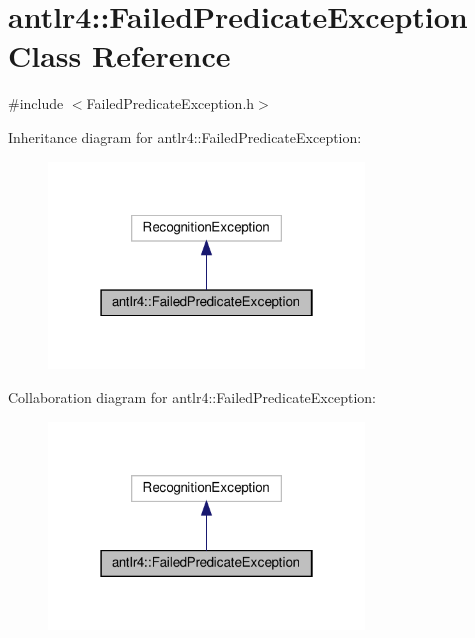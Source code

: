 \hypertarget{classantlr4_1_1FailedPredicateException}{}\section{antlr4\+:\+:Failed\+Predicate\+Exception Class Reference}
\label{classantlr4_1_1FailedPredicateException}


{\ttfamily \#include $<$Failed\+Predicate\+Exception.\+h$>$}



Inheritance diagram for antlr4\+:\+:Failed\+Predicate\+Exception\+:
\nopagebreak
\begin{figure}[H]
\begin{center}
\leavevmode
\includegraphics[width=238pt]{classantlr4_1_1FailedPredicateException__inherit__graph}
\end{center}
\end{figure}


Collaboration diagram for antlr4\+:\+:Failed\+Predicate\+Exception\+:
\nopagebreak
\begin{figure}[H]
\begin{center}
\leavevmode
\includegraphics[width=238pt]{classantlr4_1_1FailedPredicateException__coll__graph}
\end{center}
\end{figure}
